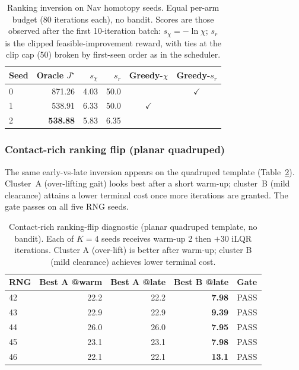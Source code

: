 \documentclass[lettersize,journal]{IEEEtran}
\begin{document}
\begin{table}[t]
\caption{Ranking inversion on Nav homotopy seeds.  Equal per-arm budget
(80 iterations each), no bandit.  Scores are those observed after the first
10-iteration batch: $s_\chi = -\ln\chi$; $s_r$ is the clipped
feasible-improvement reward, with ties at the clip cap (50) broken by
first-seen order as in the scheduler.}
\label{tab:ranking_flip}
\centering
\footnotesize
\begin{tabular}{lrrrcc}
\toprule
Seed & Oracle $J^\star$ & $s_\chi$ & $s_r$ & Greedy-$\chi$ & Greedy-$s_r$ \\
\midrule
0 & 871.26 & 4.03 & 50.0 & & $\checkmark$ \\
1 & 538.91 & 6.33 & 50.0 & $\checkmark$ & \\
2 & \textbf{538.88} & 5.83 & 6.35 & & \\
\bottomrule
\end{tabular}
\end{table}

\subsubsection{Contact-rich ranking flip (planar quadruped)}

The same early-vs-late inversion appears on the quadruped template
(Table~\ref{tab:quad_diag}).  Cluster~A (over-lifting gait) looks best
after a short warm-up; cluster~B (mild clearance) attains a lower terminal
cost once more iterations are granted.  The gate passes on all five RNG
seeds.

\begin{table}[t]
\caption{Contact-rich ranking-flip diagnostic (planar quadruped template,
no bandit).  Each of $K=4$ seeds receives warm-up 2 then $+30$ iLQR iterations.
Cluster A (over-lift) is better after warm-up; cluster B (mild clearance)
achieves lower terminal cost.}
\label{tab:quad_diag}
\centering
\footnotesize
\begin{tabular}{lrrrl}
\toprule
RNG & Best A @warm & Best A @late & Best B @late & Gate \\
\midrule
42 & 22.2 & 22.2 & \textbf{7.98} & PASS \\
43 & 22.9 & 22.9 & \textbf{9.39} & PASS \\
44 & 26.0 & 26.0 & \textbf{7.95} & PASS \\
45 & 23.1 & 23.1 & \textbf{7.98} & PASS \\
46 & 22.1 & 22.1 & \textbf{13.1} & PASS \\
\bottomrule
\end{tabular}
\end{table}
\end{document}
